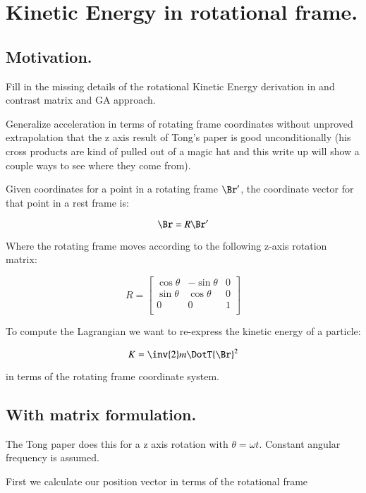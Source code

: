 \chapter{Kinetic Energy in rotational frame.}\label{chap:PJKeRot}
\date{April 30, 2008.  keRotation.tex}

\section{Motivation. }

Fill in the missing details of the rotational Kinetic Energy derivation in
\cite{TongDynamics}
and contrast matrix and GA approach.

Generalize acceleration in terms
of rotating frame coordinates without unproved extrapolation that the z axis result
of Tong's paper is good unconditionally (his cross products are kind of pulled out of
a magic hat and this write up will show a couple ways to see where they come from).

Given coordinates for a point in a rotating frame $\Br'$, the coordinate vector for that point
in a rest frame is:

\begin{equation}\label{eqn:keRot:rotcoord}
\Br = R \Br'
\end{equation}

Where the rotating frame moves according to the following z-axis rotation matrix:

\[
R = 
\begin{bmatrix}
\cos \theta & -\sin \theta & 0 \\
\sin \theta & \cos \theta & 0 \\
0 & 0 & 1 \\
\end{bmatrix}
\]

To compute the Lagrangian we want to re-express the 
kinetic energy of a particle:

\[
K = 
\inv{2} m \DotT{\Br}^2
\]

in terms of the rotating frame coordinate system.

\section{With matrix formulation. }

The Tong paper does this for a z axis rotation with $\theta = \omega t$.
Constant angular frequency is assumed.

First we calculate our position vector in terms of the rotational frame

